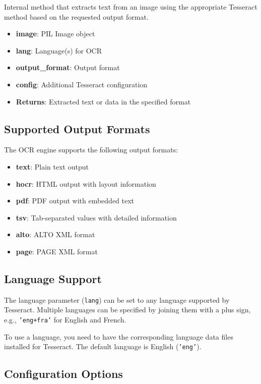 Internal method that extracts text from an image using the appropriate Tesseract method based on the requested output format.

\begin{itemize}
  \item \textbf{image}: PIL Image object
  \item \textbf{lang}: Language(s) for OCR
  \item \textbf{output\_format}: Output format
  \item \textbf{config}: Additional Tesseract configuration
  \item \textbf{Returns}: Extracted text or data in the specified format
\end{itemize}

\subsection{Supported Output Formats}

The OCR engine supports the following output formats:

\begin{itemize}
  \item \textbf{text}: Plain text output
  \item \textbf{hocr}: HTML output with layout information
  \item \textbf{pdf}: PDF output with embedded text
  \item \textbf{tsv}: Tab-separated values with detailed information
  \item \textbf{alto}: ALTO XML format
  \item \textbf{page}: PAGE XML format
\end{itemize}

\subsection{Language Support}

The language parameter (\texttt{lang}) can be set to any language supported by Tesseract. Multiple languages can be specified by joining them with a plus sign, e.g., \texttt{'eng+fra'} for English and French.

To use a language, you need to have the corresponding language data files installed for Tesseract. The default language is English (\texttt{'eng'}).

\subsection{Configuration Options}

